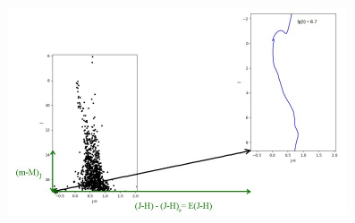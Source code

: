 \documentclass{beamer}
\begin{document}
    \begin{frame}
        \begin{figure}
            \centering
                \includegraphics[width=0.8\textwidth]{pictures/Alsa.jpg}
            \end{figure}
    \end{frame}
\end{document}
